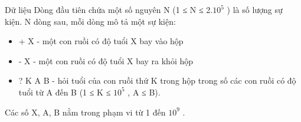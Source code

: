 Dữ liệu
Dòng đầu tiên chứa một số nguyên N (1 ≤ N ≤ 2.$10^{5}$   ) là số lượng sự kiện. N dòng sau, mỗi dòng mô tả một sự kiện:  
\begin{itemize}
	\item     + X - một con ruồi có độ tuổi X bay vào hộp   
	\item     - X - một con ruồi có độ tuổi X bay ra khỏi hộp   
	\item     ? K A B - hỏi tuổi của con ruồi thứ K trong hộp trong số các con ruồi có độ tuổi từ A đến B (1 ≤ K ≤ $10^{5}$    , A ≤ B).   
\end{itemize}

   Các số X, A, B nằm trong phạm vi từ 1 đến $10^{9}$   .